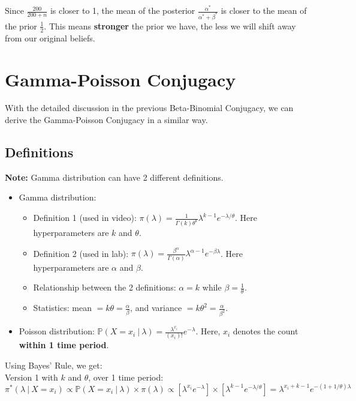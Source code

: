 \documentclass{article}
\def\dsst{\displaystyle}
\begin{document}
Since $\dsst \frac{200}{200+n}$ is closer to 1, the mean of the posterior $\dsst \frac{\alpha^*}{\alpha^*+\beta^*}$ is closer to the mean of the prior $\dsst \frac{1}{2}$. This means \textbf{stronger} the prior we have, the less we will shift away from our original beliefs.

\section{Gamma-Poisson Conjugacy}

With the detailed discussion in the previous Beta-Binomial Conjugacy, we can derive the Gamma-Poisson Conjugacy in a similar way.

\subsection{Definitions}

\textbf{Note:} Gamma distribution can have 2 different definitions.

\begin{itemize}
\item Gamma distribution: 
\begin{itemize}
\item Definition 1 (used in video): $ \dsst \pi(\lambda) = \frac{1}{\Gamma(k)\theta^k}\lambda^{k-1}e^{-\lambda/\theta}$. Here hyperparameters are $k$ and $\theta$.

\item Definition 2 (used in lab): $ \dsst \pi(\lambda) = \frac{\beta^\alpha}{\Gamma(\alpha)}\lambda^{\alpha-1}e^{-\beta\lambda} $. Here hyperparameters are $\alpha$ and $\beta$.

\item Relationship between the 2 definitions: $\alpha=k$ while $\beta = \dsst \frac{1}{\theta}$.

\item Statistics: mean $= k\theta = \dsst \frac{\alpha}{\beta}$, and variance $= k\theta^2 = \dsst \frac{\alpha}{\beta^2} $.
\end{itemize}
\item Poisson distribution: $\dsst \mathbb{P}(X = x_i~|~\lambda) = \frac{\lambda^{x_i}}{(x_i)!}e^{-\lambda} $. Here, $x_i$ denotes the count \textbf{within 1 time period}.\\
\end{itemize}

Using Bayes' Rule, we get:\\

Version 1 with $k$ and $\theta$, over 1 time period:
$$ \pi^*(\lambda~|~X=x_i) \propto \mathbb{P}(X=x_i~|~\lambda)\times \pi(\lambda) \propto \left[\lambda^{x_i}e^{-\lambda}\right]\times\left[\lambda^{k-1}e^{-\lambda/\theta}\right]=\lambda^{x_i+k-1}e^{-(1+1/\theta)\lambda} $$ 
\end{document}
